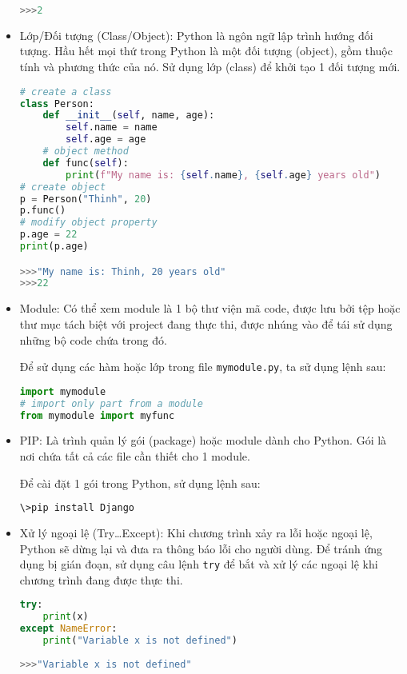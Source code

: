\begin{itemize}
\begin{lstlisting}[language=Python]
>>>2
	\end{lstlisting}
	\item Lớp/Đối tượng (Class/Object): Python là ngôn ngữ lập trình hướng đối tượng. Hầu hết mọi thứ trong Python là một đối tượng (object), gồm thuộc tính và phương thức của nó. Sử dụng lớp (class) để khởi tạo 1 đối tượng mới.
	\begin{lstlisting}[language=Python]
# create a class
class Person:
	def __init__(self, name, age):
		self.name = name
		self.age = age
	# object method
	def func(self):
		print(f"My name is: {self.name}, {self.age} years old")
# create object
p = Person("Thinh", 20)
p.func()
# modify object property
p.age = 22
print(p.age)

>>>"My name is: Thinh, 20 years old"
>>>22
	\end{lstlisting}
	\item Module: Có thể xem module là 1 bộ thư viện mã code, được lưu bởi tệp hoặc thư mục tách biệt với project đang thực thi, được nhúng vào để tái sử dụng những bộ code chứa trong đó.
	\\\par
	Để sử dụng các hàm hoặc lớp trong file \texttt{mymodule.py}, ta sử dụng lệnh sau:
	\begin{lstlisting}[language=Python]
import mymodule
# import only part from a module
from mymodule import myfunc
	\end{lstlisting}
	\item PIP: Là trình quản lý gói (package) hoặc module dành cho Python. Gói là nơi chứa tất cả các file cần thiết cho 1 module.
	\\\par
	Để cài đặt 1 gói trong Python, sử dụng lệnh sau:
	\begin{lstlisting}[language=bash]
\>pip install Django
	\end{lstlisting}
	\item Xử lý ngoại lệ (Try\ldots Except): Khi chương trình xảy ra lỗi hoặc ngoại lệ, Python sẽ dừng lại và đưa ra thông báo lỗi cho người dùng. Để tránh ứng dụng bị gián đoạn, sử dụng câu lệnh \texttt{try} để bắt và xử lý các ngoại lệ khi chương trình đang được thực thi.
	\begin{lstlisting}[language=Python]
try:
	print(x)
except NameError:
	print("Variable x is not defined")
	
>>>"Variable x is not defined"
	\end{lstlisting}
\end{itemize}
